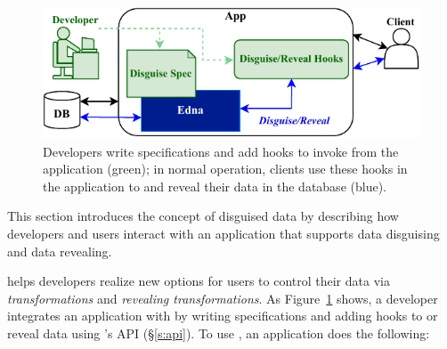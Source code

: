 \begin{figure}[t]
  \centering
    \includegraphics[width=.7\textwidth]{figs/edna_overview}
    \caption[Developers write disguise specifications and add hooks to invoke
    Edna's API.]{Developers write \xx specifications and add hooks to invoke
    \sys from the application (green); in normal operation, clients use these
    hooks in the application to \xx and reveal their data in the database
    (blue).}
  \label{f:edna-overview}
\end{figure}
%

This section introduces the concept of disguised data by describing how
developers and users interact with an application that supports data disguising
and data revealing.
%

%
\sys helps developers realize new options for users to control their data
via \emph{\xxing transformations} and \emph{revealing transformations}.
%
As Figure~\ref{f:edna-overview} shows, a developer integrates an application with \sys by writing \xx specifications
and adding hooks to \xx or reveal data using \sys's API (\S\ref{s:api}). To use \sys, an application does the following:

